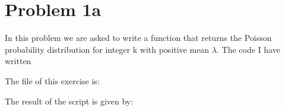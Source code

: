 \section{Problem 1a}

In this problem we are asked to write a function that returns the Poisson probability distribution for integer k with positive mean $\lambda$. The code I have written 

The file of this exercise is:



The result of the script is given by: